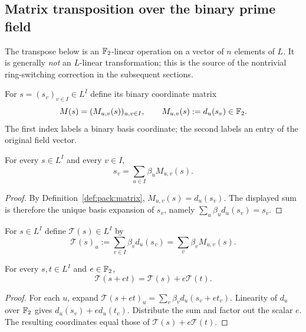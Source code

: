 \subsection{Matrix transposition over the binary prime field}\label{sec:packing:transpose}

The transpose below is an $\mathbb{F}_2$-linear operation on
a vector of $n$ elements of $L$.
It is generally \emph{not} an $L$-linear transformation;
this is the source of the nontrivial ring-switching
correction in the subsequent sections.

\begin{definition}\label{def:pack:matrix}
For $s=(s_v)_{v\in I}\in L^I$ define its
binary coordinate matrix
\[
 M(s)=(M_{u,v}(s))_{u,v\in I},\qquad
 M_{u,v}(s):=d_u(s_v)\in\mathbb{F}_2.
\]
The first index labels a binary basis coordinate;
the second labels an entry of the original field vector.
\end{definition}

\begin{lemma}\label{lem:pack:matrix-reconstruct}
For every $s\in L^I$ and every $v\in I$,
\[
 s_v=\sum_{u\in I}\beta_uM_{u,v}(s).
\]
\end{lemma}
\begin{proof}
By Definition~\ref{def:pack:matrix},
$M_{u,v}(s)=d_u(s_v)$.
The displayed sum is therefore the unique
basis expansion of $s_v$, namely
$\sum_u\beta_ud_u(s_v)=s_v$.
\end{proof}

\begin{definition}\label{def:pack:transpose}
For $s\in L^I$ define $\mathcal T(s)\in L^I$ by
\[
 \boxed{\mathcal T(s)_u
      :=\sum_{v\in I}\beta_vd_u(s_v)
      =\sum_v\beta_vM_{u,v}(s).}
\]
\end{definition}

\begin{lemma}\label{lem:pack:transpose-linear}
For every $s,t\in L^I$ and
$e\in\mathbb{F}_2$,
\[
 \mathcal T(s+et)=\mathcal T(s)+e\mathcal T(t).
\]
\end{lemma}
\begin{proof}
For each $u$, expand
$\mathcal T(s+et)_u=
\sum_v\beta_vd_u(s_v+et_v)$.
Linearity of $d_u$ over $\mathbb{F}_2$ gives
$d_u(s_v)+ed_u(t_v)$.
Distribute the sum and factor out the scalar $e$.
The resulting coordinates equal those of
$\mathcal T(s)+e\mathcal T(t)$.
\end{proof}

